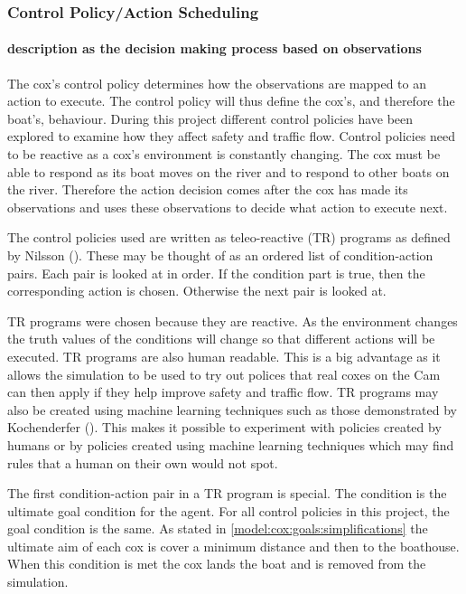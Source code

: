       \subsubsection{Control Policy/Action Scheduling}
      \paragraph{description as the decision making process based on observations}
      The cox's control policy determines how the observations are mapped to an action to execute. The control policy will thus define the cox's, and therefore the boat's, behaviour. During this project different control policies have been explored to examine how they affect safety and traffic flow. Control policies need to be reactive as a cox's environment is constantly changing. The cox must be able to respond as its boat moves on the river and to respond to other boats on the river. Therefore the action decision comes after the cox has made its observations and uses these observations to decide what action to execute next.
      
      The control policies used are written as teleo-reactive (TR) programs as defined by Nilsson (\cite{Nilsson1994}). These may be thought of as an ordered list of condition-action pairs. Each pair is looked at in order. If the condition part is true, then the corresponding action is chosen. Otherwise the next pair is looked at.
      
      TR programs were chosen because they are reactive. As the environment changes the truth values of the conditions will change so that different actions will be executed. TR programs are also human readable. This is a big advantage as it allows the simulation to be used to try out polices that real coxes on the Cam can then apply if they help improve safety and traffic flow. TR programs may also be created using machine learning techniques such as those demonstrated by Kochenderfer (\cite{Kochenderfer2003}). This makes it possible to experiment with policies created by humans or by policies created using machine learning techniques which may find rules that a human on their own would not spot.
      
      The first condition-action pair in a TR program is special. The condition is the ultimate goal condition for the agent. For all control policies in this project, the goal condition is the same. As stated in \ref{model:cox:goals:simplifications} the ultimate aim of each cox is cover a minimum distance and then to the boathouse. When this condition is met the cox lands the boat and is removed from the simulation.

